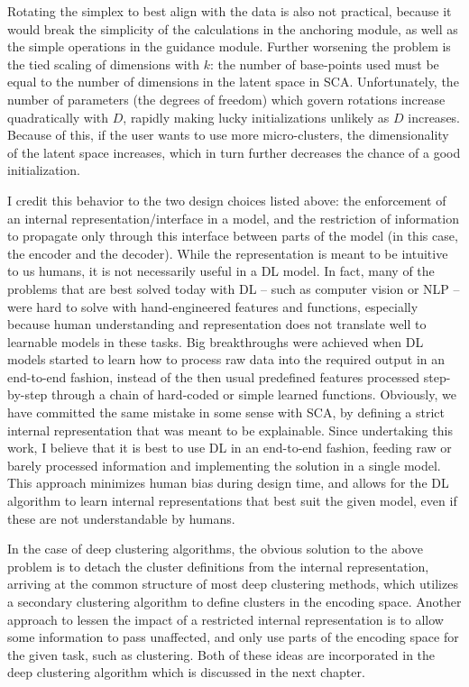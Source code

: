		Rotating the simplex to best align with the data is also not practical, because it would break the simplicity of the calculations in the anchoring module, as well as the simple operations in the guidance module.	
		Further worsening the problem is the tied scaling of dimensions with $k$: the number of base-points used must be equal to the number of dimensions in the latent space in \ac{SCA}.
		Unfortunately, the number of parameters (the degrees of freedom) which govern rotations increase quadratically with $D$, rapidly making lucky initializations unlikely as $D$ increases. 
		Because of this, if the user wants to use more micro-clusters, the dimensionality of the latent space increases, which in turn further decreases the chance of a good initialization.
		
		I credit this behavior to the two design choices listed above: the enforcement of an internal representation/interface in a model, and the restriction of information to propagate only through this interface between parts of the model (in this case, the encoder and the decoder).
		While the representation is meant to be intuitive to us humans, it is not necessarily useful in a \ac{DL} model.
		In fact, many of the problems that are best solved today with \ac{DL} -- such as computer vision or \ac{NLP} -- were hard to solve with hand-engineered features and functions, especially because human understanding and representation does not translate well to learnable models in these tasks.
		Big breakthroughs were achieved when \ac{DL} models started to learn how to process raw data into the required output in an end-to-end fashion, instead of the then usual predefined features processed step-by-step through a chain of hard-coded or simple learned functions.
		Obviously, we have committed the same mistake in some sense with \ac{SCA}, by defining a strict internal representation that was meant to be explainable.
		Since undertaking this work, I believe that it is best to use \ac{DL} in an end-to-end fashion, feeding raw or barely processed information and implementing the solution in a single model.
		This approach minimizes human bias during design time, and allows for the \ac{DL} algorithm to learn internal representations that best suit the given model, even if these are not understandable by humans.
		
		In the case of deep clustering algorithms, the obvious solution to the above problem is to detach the cluster definitions from the internal representation, arriving at the common structure of most deep clustering methods, which utilizes a secondary clustering algorithm to define clusters in the encoding space.
		Another approach to lessen the impact of a restricted internal representation is to allow some information to pass unaffected, and only use parts of the encoding space for the given task, such as clustering.
		Both of these ideas are incorporated in the deep clustering algorithm which is discussed in the next chapter.
		
